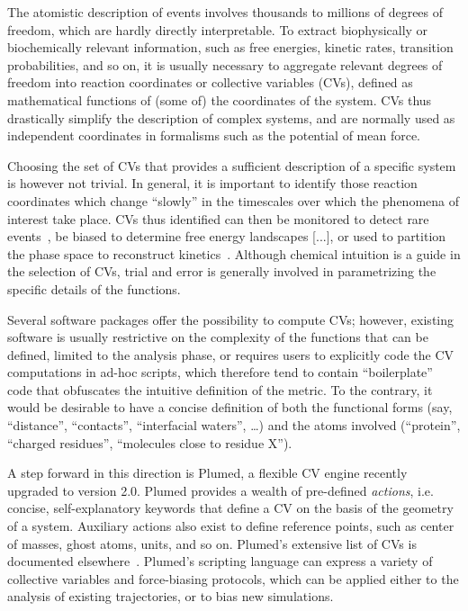 \documentclass[preprint,12pt]{elsarticle}
\begin{document}
The atomistic description of events involves thousands to millions of
degrees of freedom, which are hardly directly interpretable. To
extract biophysically or biochemically relevant information, such
as free energies, kinetic rates, transition probabilities, and so on,
it is usually necessary to aggregate relevant degrees of freedom
into reaction coordinates or collective variables (CVs), defined
as mathematical functions of (some of) the coordinates of the system.
CVs thus drastically simplify the description of complex systems, and
are normally  used as independent coordinates in formalisms such as
the potential of mean force. 

Choosing the set of CVs that provides a sufficient description of a
specific system is however not trivial. In general, it is important to
identify those reaction coordinates which change ``slowly'' in the
timescales over which the phenomena of interest take place. CVs thus
identified can then be monitored to detect rare events~\cite{Giorgino_Buch_2012}, be
biased to determine free energy landscapes [...], or used to partition
the phase space to reconstruct
kinetics~\cite{Buch_Giorgino_2011,Biarnes_Pietrucci_Marinelli_Laio_2012}.
Although chemical intuition is a guide in the selection of CVs, trial
and error is generally involved in parametrizing the specific details
of the functions.

Several software packages offer the possibility to compute CVs;
however, existing software is usually restrictive on the complexity of
the functions that can be defined, limited to the analysis phase, or
requires users to explicitly code the CV computations in ad-hoc
scripts, which therefore tend to contain ``boilerplate'' code that
obfuscates the intuitive definition of the metric. To the contrary, it
would be desirable to have a concise definition of both the functional
forms (say, ``distance'', ``contacts'', ``interfacial waters'', \dots)
and the atoms involved (``protein'', ``charged residues'', ``molecules
close to residue X'').

A step forward in this direction is Plumed, a flexible CV engine
recently upgraded to version 2.0. Plumed provides a wealth of
pre-defined \emph{actions}, i.e. concise, self-explanatory keywords that define a CV on
the basis of the geometry of a system. Auxiliary actions also exist to
define reference points, such as center of masses, ghost atoms, units,
and so on. Plumed's extensive list of CVs is documented
elsewhere~\cite{plumed_manual,bonomi_plumed:_2009}.  Plumed's
scripting language can express a variety of collective variables and
force-biasing protocols, which can be applied either to the analysis
of existing trajectories, or to bias new simulations.
\end{document}
